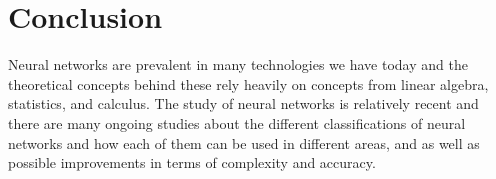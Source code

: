 \documentclass[a4paper, 11pt, english]{article}
\begin{document}
\section{Conclusion}
\par Neural networks are prevalent in many technologies we have today and the theoretical concepts behind these rely heavily on concepts from linear algebra, statistics, and calculus. The study of neural networks is relatively recent and there are many ongoing studies about the different classifications of neural networks and how each of them can be used in different areas, and as well as possible improvements in terms of complexity and accuracy.

\newpage
\printbibliography
\end{document}

